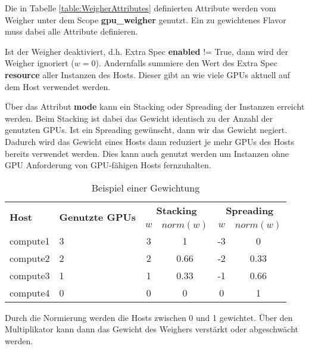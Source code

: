 \documentclass[../Main.tex]{subfiles}
\begin{document}
Die in Tabelle \ref{table:WeigherAttributes} definierten Attribute werden vom Weigher
unter dem Scope \textbf{gpu\_weigher} genutzt. Ein zu gewichtenes Flavor muss dabei alle Attribute
definieren.

Ist der Weigher deaktiviert, d.h. Extra Spec \textbf{enabled} != True, dann wird der Weigher ignoriert ($w = 0$).
Andernfalls summiere den Wert des Extra Spec \textbf{resource} aller Instanzen des Hosts. Dieser gibt
an wie viele GPUs aktuell auf dem Host verwendet werden.

Über das Attribut \textbf{mode} kann ein Stacking oder Spreading der Instanzen erreicht werden. Beim Stacking
ist dabei das Gewicht identisch zu der Anzahl der genutzten GPUs. Ist ein Spreading gewünscht,
dann wir das Gewicht negiert. Dadurch wird das Gewicht eines Hosts dann reduziert je mehr GPUs des Hosts bereits
verwendet werden. Dies kann auch genutzt werden um Instanzen ohne GPU Anforderung von GPU-fähigen Hosts fernzuhalten.

\begin{table}[H]
  \centering
  \caption{Beispiel einer Gewichtung}
  \renewcommand{\arraystretch}{1.2}
  \begin{tabular}{|p{3cm}|p{4cm}|c|c|c|c|}
    \hline
    \multirow{2}{3cm}{\textbf{Host}} & \multirow{2}{4cm}{\textbf{Genutzte GPUs}} & \multicolumn{2}{c|}{\textbf{Stacking}} & \multicolumn{2}{c|}{\textbf{Spreading}} \\
    \cline{3-6}
    & & \textbf{$w$} & \textbf{$norm(w)$} & \textbf{$w$} & \textbf{$norm(w)$} \\
    \hline
    compute1 & 3 & 3 & 1\phantom{.00} & -3 & 0\phantom{.00} \\ \hline
    compute2 & 2 & 2 & 0.66 & -2 & 0.33 \\ \hline
    compute3 & 1 & 1 & 0.33 & -1 & 0.66 \\ \hline
    compute4 & 0 & 0 & 0\phantom{.00} & \phantom{-}0 & 1\phantom{.00} \\ \hline
  \end{tabular}
  \label{table:WeighingExample}
\end{table}

Durch die Normierung werden die Hosts zwischen 0 und 1 gewichtet. Über den Multiplikator kann dann das Gewicht
des Weighers verstärkt oder abgeschwächt werden.

\biblio %
\end{document}

